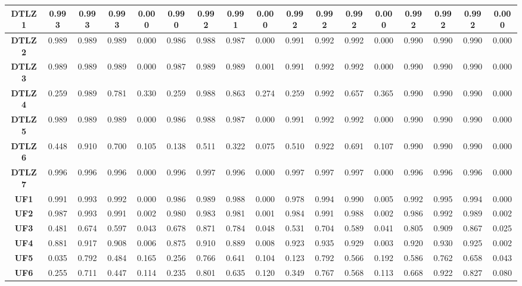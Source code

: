 \begin{table*}[]
{\begin{tabular}{c c|c|c|c|c|c|c|c|c|c|c|c|c|c|c|c}
\multicolumn{1}{c|}{\textbf{DTLZ1}} & 0.993 & 0.993 & 0.993 & 0.000 & 0.990 & 0.992 & 0.991 & 0.000 & 0.992 & 0.992 & 0.992 & 0.000 & 0.992 & 0.992 & 0.992 & 0.000 \\ \hline
\multicolumn{1}{c|}{\textbf{DTLZ2}} & 0.989 & 0.989 & 0.989 & 0.000 & 0.986 & 0.988 & 0.987 & 0.000 & 0.991 & 0.992 & 0.992 & 0.000 & 0.990 & 0.990 & 0.990 & 0.000 \\ \hline
\multicolumn{1}{c|}{\textbf{DTLZ3}} & 0.989 & 0.989 & 0.989 & 0.000 & 0.987 & 0.989 & 0.989 & 0.001 & 0.991 & 0.992 & 0.992 & 0.000 & 0.990 & 0.990 & 0.990 & 0.000 \\ \hline
\multicolumn{1}{c|}{\textbf{DTLZ4}} & 0.259 & 0.989 & 0.781 & 0.330 & 0.259 & 0.988 & 0.863 & 0.274 & 0.259 & 0.992 & 0.657 & 0.365 & 0.990 & 0.990 & 0.990 & 0.000 \\ \hline
\multicolumn{1}{c|}{\textbf{DTLZ5}} & 0.989 & 0.989 & 0.989 & 0.000 & 0.986 & 0.988 & 0.987 & 0.000 & 0.991 & 0.992 & 0.992 & 0.000 & 0.990 & 0.990 & 0.990 & 0.000 \\ \hline
\multicolumn{1}{c|}{\textbf{DTLZ6}} & 0.448 & 0.910 & 0.700 & 0.105 & 0.138 & 0.511 & 0.322 & 0.075 & 0.510 & 0.922 & 0.691 & 0.107 & 0.990 & 0.990 & 0.990 & 0.000 \\ \hline
\multicolumn{1}{c|}{\textbf{DTLZ7}} & 0.996 & 0.996 & 0.996 & 0.000 & 0.996 & 0.997 & 0.996 & 0.000 & 0.997 & 0.997 & 0.997 & 0.000 & 0.996 & 0.996 & 0.996 & 0.000 \\ \hline
\multicolumn{1}{c|}{\textbf{UF1}} & 0.991 & 0.993 & 0.992 & 0.000 & 0.986 & 0.989 & 0.988 & 0.000 & 0.978 & 0.994 & 0.990 & 0.005 & 0.992 & 0.995 & 0.994 & 0.000 \\ \hline
\multicolumn{1}{c|}{\textbf{UF2}} & 0.987 & 0.993 & 0.991 & 0.002 & 0.980 & 0.983 & 0.981 & 0.001 & 0.984 & 0.991 & 0.988 & 0.002 & 0.986 & 0.992 & 0.989 & 0.002 \\ \hline
\multicolumn{1}{c|}{\textbf{UF3}} & 0.481 & 0.674 & 0.597 & 0.043 & 0.678 & 0.871 & 0.784 & 0.048 & 0.531 & 0.704 & 0.589 & 0.041 & 0.805 & 0.909 & 0.867 & 0.025 \\ \hline
\multicolumn{1}{c|}{\textbf{UF4}} & 0.881 & 0.917 & 0.908 & 0.006 & 0.875 & 0.910 & 0.889 & 0.008 & 0.923 & 0.935 & 0.929 & 0.003 & 0.920 & 0.930 & 0.925 & 0.002 \\ \hline
\multicolumn{1}{c|}{\textbf{UF5}} & 0.035 & 0.792 & 0.484 & 0.165 & 0.256 & 0.766 & 0.641 & 0.104 & 0.123 & 0.792 & 0.566 & 0.192 & 0.586 & 0.762 & 0.658 & 0.043 \\ \hline
\multicolumn{1}{c|}{\textbf{UF6}} & 0.255 & 0.711 & 0.447 & 0.114 & 0.235 & 0.801 & 0.635 & 0.120 & 0.349 & 0.767 & 0.568 & 0.113 & 0.668 & 0.922 & 0.827 & 0.080 \\ \hline

\end{tabular}}
\end{table*}
